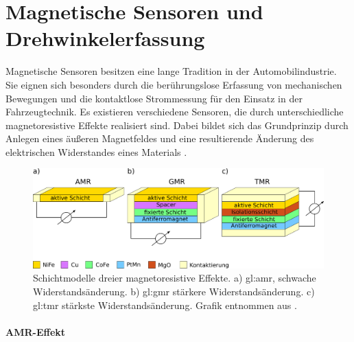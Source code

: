 %

\section{Magnetische Sensoren und Drehwinkelerfassung}\label{sec:magnetische-sensoren}


Magnetische Sensoren besitzen eine lange Tradition in der Automobilindustrie. Sie eignen sich besonders durch die berührungslose Erfassung von mechanischen Bewegungen und die kontaktlose Strommessung für den Einsatz in der Fahrzeugtechnik. Es existieren verschiedene Sensoren, die durch unterschiedliche magnetoresistive Effekte realisiert sind. Dabei bildet sich das Grundprinzip durch Anlegen eines äußeren Magnetfeldes und eine resultierende Änderung des elektrischen Widerstandes eines Materials \cite{Tille2020}.


\vspace{5mm}
\begin{figure}[tbph]
	\centering
	\includegraphics[width=\linewidth]{chapters/images/2-Grundlagen/MR_Schichtmodelle}
	\caption[Schichtmodelle dreier magnetoresistive Effekte]{Schichtmodelle dreier magnetoresistive Effekte. a) 
		\gls{gl:amr}, schwache Widerstandsänderung. b) \gls{gl:gmr} stärkere Widerstandsänderung. c) \gls{gl:tmr} stärkste 
		Widerstandsänderung. Grafik entnommen aus \cite{Lemme2016}.}
	\label{fig:mrschichtmodelle}
\end{figure}


\clearpage


\paragraph{AMR-Effekt}\label{par:AMR}$~$\\


